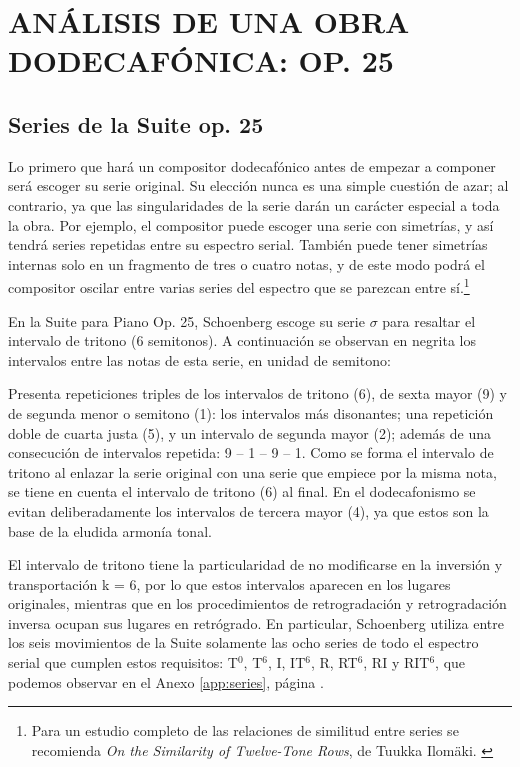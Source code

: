 \chapter{ANÁLISIS DE UNA OBRA DODECAFÓNICA: OP. 25}\label{ch:suite}
	\section{Series de la Suite op. 25}
		Lo primero que hará un compositor dodecafónico antes de empezar a componer será escoger su serie original. Su elección nunca es una simple cuestión de azar; al contrario, ya que las singularidades de la serie darán un carácter especial a toda la obra. Por ejemplo, el compositor puede escoger una serie con simetrías, y así tendrá series repetidas entre su espectro serial. También puede tener simetrías internas solo en un fragmento de tres o cuatro notas, y de este modo podrá el compositor oscilar entre varias series del espectro que se parezcan entre sí.\footnote{Para un estudio completo de las relaciones de similitud entre series se recomienda \emph{On the Similarity of Twelve-Tone Rows}, de Tuukka Ilomäki. \cite{ilomaki}}
		
		En la Suite para Piano Op. 25, Schoenberg escoge su serie $\sigma$ para resaltar el intervalo de tritono (6 semitonos). A continuación se observan en negrita los intervalos entre las notas de esta serie, en unidad de semitono:
		
				
		Presenta repeticiones triples de los intervalos de tritono (6), de sexta mayor (9) y de segunda menor o semitono (1): los intervalos más disonantes; una repetición doble de cuarta justa (5), y un intervalo de segunda mayor (2); además de una consecución de intervalos repetida: 9 -- 1 -- 9 -- 1. Como se forma el intervalo de tritono al enlazar la serie original con una serie que empiece por la misma nota, se tiene en cuenta el intervalo de tritono (6) al final. En el dodecafonismo se evitan deliberadamente los intervalos de tercera mayor (4), ya que estos son la base de la eludida armonía tonal. \label{serie25}
		
		El intervalo de tritono tiene la particularidad de no modificarse en la inversión y transportación k = 6, por lo que estos intervalos aparecen en los lugares originales, mientras que en los procedimientos de retrogradación y retrogradación inversa ocupan sus lugares en retrógrado. En particular, Schoenberg utiliza entre los seis movimientos de la Suite solamente las ocho series de todo el espectro serial que cumplen estos requisitos: T$^0$, T$^6$, I, IT$^6$, R, RT$^6$, RI y RIT$^6$, que podemos observar en el Anexo \ref{app:series}, página \pageref{app:series}.
		
